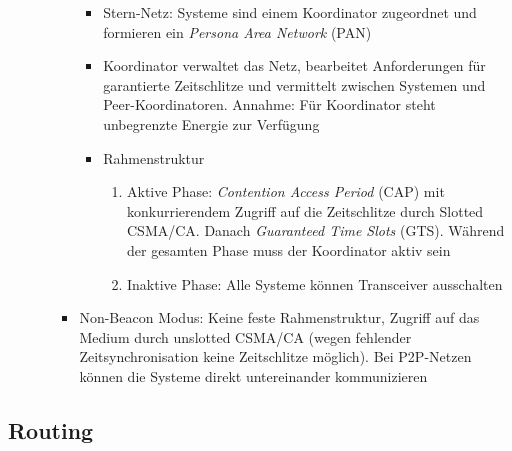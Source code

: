 \begin{itemize}
\begin{itemize}
\begin{itemize}
\begin{itemize}
				\item Stern-Netz: Systeme sind einem Koordinator zugeordnet und formieren ein \textit{Persona Area Network} (PAN)
				\item Koordinator verwaltet das Netz, bearbeitet Anforderungen für garantierte Zeitschlitze und vermittelt zwischen Systemen und Peer-Koordinatoren. Annahme: Für Koordinator steht unbegrenzte Energie zur Verfügung
				\item Rahmenstruktur
				\begin{enumerate}
					\item Aktive Phase: \textit{Contention Access Period} (CAP) mit konkurrierendem Zugriff auf die Zeitschlitze durch Slotted CSMA/CA. Danach \textit{Guaranteed Time Slots} (GTS). Während der gesamten Phase muss der Koordinator aktiv sein
					\item Inaktive Phase: Alle Systeme können Transceiver ausschalten
				\end{enumerate}
			\end{itemize}
			\item Non-Beacon Modus: Keine feste Rahmenstruktur, Zugriff auf das Medium durch unslotted CSMA/CA (wegen fehlender Zeitsynchronisation keine Zeitschlitze möglich). Bei P2P-Netzen können die Systeme direkt untereinander kommunizieren
		\end{itemize}
	\end{itemize}
\end{itemize}


\subsection{Routing}

